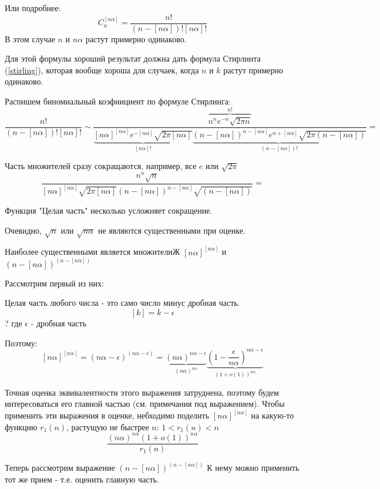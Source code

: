 Или подробнее:
$$
C_{n}^{[n \alpha]} = \frac{n!}{(n - [n \alpha])! [n \alpha]!}
$$
В этом случае $ n $ и $ n \alpha $ растут примерно одинаково.

Для этой формулы хороший результат должна дать формула Стирлинта (\ref{stirling}), которая вообще хороша для случаек, когда $ n $ и $ k $ растут примерно одинаково.

Распишем биномиальный коэфиициент по формуле Стирлинга:
$$
\frac{n!}{(n - [n \alpha])! [n \alpha]!} \sim 
\frac
{
\overbrace{ n^{n}e^{-n}\sqrt{2 \pi n} }^{n!} 
}
{
\underbrace{ [n \alpha]^{[n \alpha]} e^{-[n \alpha]} \sqrt{2 \pi [n \alpha]} }_{[n \alpha]!} 
\underbrace{ (n - [n \alpha])^{n - [n \alpha]} e^{n + [n \alpha]} \sqrt{2 \pi (n - [n \alpha])} }_{ (n - [n \alpha])! } 
} = 
$$

Часть множителей сразу сокращаются, например, все $ e $ или $ \sqrt{2 \pi}  $
$$
\frac{  n^{n} \sqrt{n} }
{
[n \alpha]^{[n \alpha]} \sqrt{2 \pi [n \alpha]}  
(n - [n \alpha])^{n - [n \alpha]} \sqrt{ (n - [n \alpha])} 
} = 
$$

Функция "Целая часть" несколько усложняет сокращение.

Очевидно, $ \sqrt{n} $ или $ \sqrt{n \alpha} $ не являются существенными при оценке.

Наиболее существенными является множителиЖ
$ [n \alpha]^{[n \alpha]} $ и $ (n - [n \alpha])^{(n -[n \alpha])} $

Рассмотрим первый из них: 

Целая часть любого числа - это само число минус дробная часть.
$$
[k] = k - \epsilon
$$
? где $ \epsilon $ - дробная часть

Поэтому:
$$
[n \alpha]^{[n \alpha]} 
= (n \alpha - \epsilon)^{(n \alpha - \epsilon)}
= 
\underbrace{ (n \alpha)^{n \alpha - \epsilon}  }_{(n \alpha)^{n \alpha}}
\underbrace{(1 - \frac{\epsilon}{n \alpha})^{n \alpha - \epsilon}}_{(1 + o(1))^{n \alpha}} 
$$

Точная оценка эквивалентности этого выражения затруднена,
поэтому будем интересоваться его главной частью (см. примечания под выражением).
Чтобы применить эти выражения в оценке, небходимо поделить $[n \alpha]^{[n \alpha]} $ на какую-то функцию $ r_1(n) $, растущую не быстрее $ n $: $ 1 < r_1(n) < n $
$$
\frac{
(n \alpha)^{n \alpha} (1 + o(1))^{n \alpha}
}
{
r_1(n)
}
$$

Теперь рассмотрим выражение $ (n - [n \alpha])^{(n -[n \alpha])} $
К нему можно применить тот же прием - т.е. оценить главную часть.

